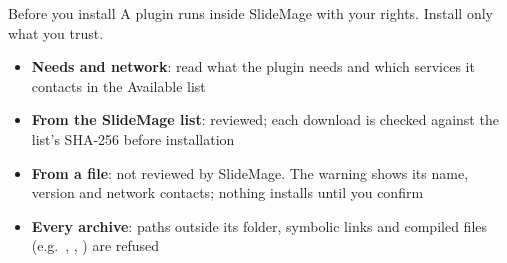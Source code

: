 
\begin{standardframe}{Before you install}
	\small
	A plugin runs inside SlideMage \textcolor{c_primary_highlight}{with your rights}.
	Install only what you trust.
	\par\medskip
	\begin{itemize}
		\item \textbf{Needs and network}: read what the plugin needs and which services it contacts in the Available list
		\item \textbf{From the SlideMage list}: reviewed; each download is checked against the list's SHA-256 before installation
		\item \textbf{From a file}: not reviewed by SlideMage. The warning shows its name, version and network contacts; nothing installs until you confirm
		\item \textbf{Every archive}: paths outside its folder, symbolic links and compiled files (e.g.\ , , ) are refused
	\end{itemize}
\end{standardframe}
